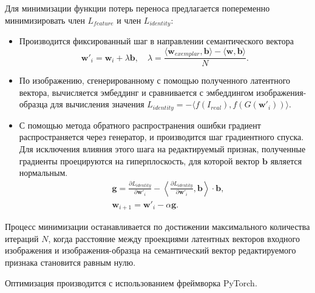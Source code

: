 \begin{enumerate}
Для минимизации функции потерь переноса предлагается попеременно минимизировать член $L_{feature}$ и член $L_{identity}$:
\begin{itemize}
    \item Производится фиксированный шаг в направлении семантического вектора
    $$\mathbf w'_i = \mathbf w_i + \lambda \mathbf b, \quad \lambda = \frac{\langle \mathbf w_{exemplar}, \mathbf b \rangle - \langle \mathbf w, \mathbf b \rangle}{N}.$$
    \item По изображению, сгенерированному с помощью полученного латентного вектора, вычисляется эмбеддинг и сравнивается с эмбеддингом изображения-образца для вычисления значения
    $L_{identity} = - \langle f(I_{real}), f(G(\mathbf w'_i)) \rangle.$
    \item С помощью метода обратного распространения ошибки градиент распространяется через генератор, и производится шаг градиентного спуска.
    Для исключения влияния этого шага на редактируемый признак, полученные градиенты проецируются на гиперплоскость, для которой вектор $\mathbf b$ является нормальным.
    \begin{align*}
    &\mathbf g = \frac{\partial L_{identity}}{\partial \mathbf w'_i} - \left\langle {\frac{\partial L_{identity}}{\partial \mathbf w'_i} , \mathbf b} \right\rangle \cdot \mathbf b,\\
    &\mathbf w_{i+1} = \mathbf w'_i - \alpha \mathbf g.
    \end{align*}
\end{itemize}

Процесс минимизации останавливается по достижении максимального количества итераций $N$, когда расстояние между проекциями латентных векторов входного изображения и изображения-образца на семантический вектор редактируемого признака становится равным нулю.

Оптимизация производится с использованием фреймворка PyTorch.

\end{enumerate}